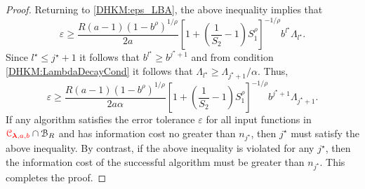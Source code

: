 \documentclass[USenglish]{article}
\theoremstyle{dgthm}
\theoremstyle{dgthm}
\theoremstyle{dgthm}
\theoremstyle{dgthm}
\theoremstyle{dgdef}
\theoremstyle{definition}
\newcommand{\DHKMchange}[1]{{\color{red}{#1}}}
\begin{document}
\begin{proof}
Returning to \eqref{DHKM:eps_LBA}, the above inequality  implies that
\begin{equation*}
    \varepsilon 
\ge  \frac{R(a-1)(1 - b^\rho)^{1/\rho}}{2a} \left[1 + \left(\frac 1 {S_2} -1 \right) S_1^\rho \right]^{-1/\rho} b^{l^\star} \Lambda_{l^\star}.
\end{equation*}
Since $l^\star \le j^{\star}+1$ it follows that $ b^{l^\star} \ge b^{j^\star+1}$ and from condition \eqref{DHKM:LambdaDecayCond} it follows that $\Lambda_{l^\star} \ge \Lambda_{j^\star+1}/\alpha$.  Thus,
\begin{equation*}
    \varepsilon 
\ge  \frac{R(a-1)(1 - b^\rho)^{1/\rho}}{2a\alpha} \left[1 + \left(\frac 1 {S_2} -1 \right) S_1^\rho \right]^{-1/\rho} b^{j^\star+1} \Lambda_{j^\star+1}.
\end{equation*}
If any algorithm satisfies the error tolerance $\varepsilon$ for all input functions in $\DHKMchange{\calC_{\boldsymbol{\lambda},a,b}} \cap \calB_R$ and has information cost no greater than $n_{j^\star}$, then $j^\star$ must satisfy the above inequality.  By contrast, if the above inequality is violated for any $j^\star$, then the information cost of the successful algorithm must be greater than $n_{j^\star}$.  This completes the proof.
\end{proof}
\end{document}
